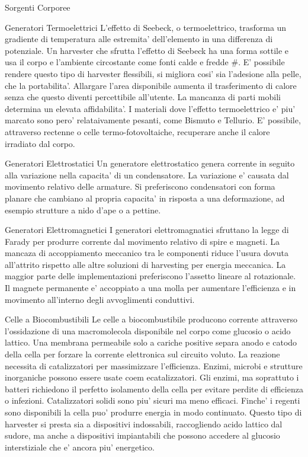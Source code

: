 \begin{section}{Sorgenti Corporee}
   \begin{subsection}{Generatori Termoelettrici}
    L'effetto di Seebeck, o termoelettrico, trasforma un gradiente di temperatura alle estremita' dell'elemento in una differenza di potenziale. Un harvester che sfrutta l'effetto di Seebeck ha una forma sottile e usa il corpo e l'ambiente circostante come fonti calde e fredde \#. E' possibile rendere questo tipo di harvester flessibili, si migliora cosi' sia l'adesione alla pelle, che la portabilita'. Allargare l'area disponibile aumenta il trasferimento di calore senza che questo diventi percettibile all'utente. La mancanza di parti mobili determina un elevata affidabilita'. I materiali dove l'effetto termoelettrico e' piu' marcato sono pero' relataivamente pesanti, come Bismuto e Tellurio. E' possibile, attraverso rectenne o celle termo-fotovoltaiche, recuperare anche il calore irradiato dal corpo.
   \end{subsection}

   \begin{subsection}{Generatori Elettrostatici}
    Un generatore elettrostatico genera corrente in seguito alla variazione nella capacita' di un condensatore. La variazione e' causata dal movimento relativo delle armature. Si preferiscono condensatori con forma planare che cambiano al propria capacita' in risposta a una deformazione, ad esempio strutture a nido d'ape o a pettine.
   \end{subsection}

   \begin{subsection}{Generatori Elettromagnetici}
    I generatori elettromagnatici sfruttano la legge di Farady per produrre corrente dal movimento relativo di spire e magneti. La mancaza di accoppiamento meccanico tra le componenti riduce l'usura dovuta all'attrito rispetto alle altre soluzioni di harvesting per energia meccanica. La maggior parte delle implementazioni preferiscono l'assetto lineare al rotazionale. Il magnete permanente e' accoppiato a una molla per aumentare l'efficienza e in movimento all'interno degli avvoglimenti conduttivi.
   \end{subsection}
   
   \begin{subsection}{Celle a Biocombustibili}
    Le celle a biocombustibile producono corrente attraverso l'ossidazione di una macromolecola disponibile nel corpo come glucosio o acido lattico. Una membrana permeabile solo a cariche positive separa anodo e catodo della cella per forzare la corrente elettronica sul circuito voluto. La reazione necessita di catalizzatori per massimizzare l'efficienza. Enzimi, microbi e strutture inorganiche possono essere usate coem ecatalizzatori. Gli enzimi, ma soprattuto i batteri richiedono il perfetto isolamento della cella per evitare perdite di efficienza o infezioni. Catalizzatori solidi sono piu' sicuri ma meno efficaci. Finche' i regenti sono disponibili la cella puo' produrre energia in modo continuato. Questo tipo di harvester si presta sia a dispositivi indossabili, raccogliendo acido lattico dal sudore, ma anche a dispositivi impiantabili che possono accedere al glucosio interstiziale che e' ancora piu' energetico. 
   \end{subsection}


\end{section}
